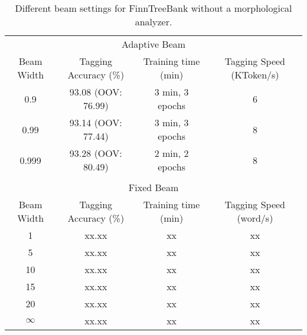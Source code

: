 \begin{table}[htb!]
\begin{center}
\begin{tabular}{cccc}
\multicolumn{4}{c}{Adaptive Beam}\\
Beam Width & Tagging Accuracy (\%) & Training time (min) & Tagging Speed (KToken/s)\\
\hline
0.9        & 93.08 (OOV: 76.99)           & 3 min, 3 epochs & 6           \\
0.99       & 93.14 (OOV: 77.44)           & 3 min, 3 epochs & 8            \\
0.999      & 93.28 (OOV: 80.49)           & 2 min, 2 epochs & 8            \\
\hline
           &                  &               &               \\
\multicolumn{4}{c}{Fixed Beam}\\
Beam Width & Tagging Accuracy (\%) & Training time (min) & Tagging Speed (word/s) \\
\hline
1        & xx.xx            & xx            & xx            \\
5        & xx.xx            & xx            & xx            \\
10       & xx.xx            & xx            & xx            \\
15       & xx.xx            & xx            & xx            \\
20       & xx.xx            & xx            & xx            \\
$\infty$       & xx.xx            & xx            & xx            \\
\hline
\end{tabular}
\caption{Different beam settings for FinnTreeBank without a morphological analyzer.}
\end{center}
\end{table}


